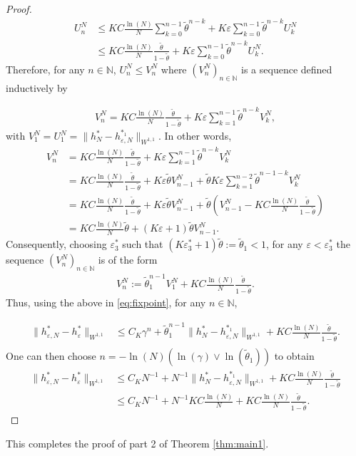 \documentclass[12pt]{article}
\newcommand{\eps}{\varepsilon}
\theoremstyle{plain}
\begin{document}
{\begin{proof}
\begin{align*}
U_n^N &\leq KC\frac{\ln(N)}{N}\sum_{k=0}^{n-1}\tilde \theta^{n-k}+K\eps\sum_{k=0}^{n-1}\tilde \theta^{n-k}U_k^N\\
&\leq KC\frac{\ln(N)}{N}\frac{\tilde \theta}{1-\tilde \theta}+K\eps\sum_{k=0}^{n-1}\tilde \theta^{n-k}U_k^N.
\end{align*}
Therefore, for any $n\in \mathbb N$, $U_n^N\leq V_n^N$ where $(V_n^N)_{n\in \mathbb N}$ is a sequence defined inductively by

\begin{align*}
  V_n^N=KC\frac{\ln(N)}{N}\frac{\tilde \theta}{1-\tilde \theta}+K\eps\sum_{k=1}^{n-1}\tilde \theta^{n-k}V_k^N,
\end{align*}
with $V_1^N=U_1^N=\|h_N^*-h_{\eps,N}^{*_1}\|_{W^{1,1}}$. In other words, 
\begin{align*}
  V_n^N&=KC\frac{\ln(N)}{N}\frac{\tilde \theta}{1-\tilde \theta}+K\eps\sum_{k=1}^{n-1}\tilde \theta^{n-k}V_k^N\\
  &=KC\frac{\ln(N)}{N}\frac{\tilde \theta}{1-\tilde \theta}+K\eps \tilde \theta V_{n-1}^N +\tilde \theta K \eps\sum_{k=1}^{n-2}\tilde \theta^{n-1-k}V_k^N\\
  &=KC\frac{\ln(N)}{N}\frac{\tilde \theta}{1-\tilde \theta}+K\eps \tilde \theta V_{n-1}^N +\tilde \theta \left( V_{n-1}^N-KC\frac{\ln(N)}{N}\frac{\tilde \theta}{1-\tilde \theta}\right)\\
&=KC\frac{\ln(N)}{N}\tilde \theta+(K\eps +1)\tilde \theta  V_{n-1}^N.
\end{align*}
Consequently, choosing $\eps_{3}^*$ such that $(K\eps_{3}^* +1)\tilde \theta:=\tilde\theta_1<1$, for any $\eps <\eps_{3}^*$ the sequence $(V_n^N)_{n\in \mathbb N}$ is of the form
\begin{align*}
V_n^N:=\tilde\theta_1^{n-1}V_1^N+KC\frac{\ln(N)}{N}\frac{\tilde \theta}{1-\tilde \theta}.
\end{align*}
Thus, using the above in \eqref{eq:fixpoint}, for any $n\in \mathbb N$,

\begin{align*}
\|h_{\varepsilon,N}^*-h_\eps^*\|_{W^{1,1}}
&\leq C_K \gamma^n+\tilde\theta_1^{n-1}\|h_N^*-h_{\eps,N}^{*_1}\|_{W^{1,1}}+KC\frac{\ln(N)}{N}\frac{\tilde \theta}{1-\tilde \theta}.\\
\end{align*}
One can then choose $n=-\ln(N)(\ln(\gamma)\vee \ln(\tilde\theta_1))$ to obtain
\begin{align*}
\|h_{\varepsilon,N}^*-h_\eps^*\|_{W^{1,1}}&\leq  C_K N^{-1}+N^{-1}\|h_N^*-h_{\eps,N}^{*_1}\|_{W^{1,1}}+KC\frac{\ln(N)}{N}\frac{\tilde \theta}{1-\tilde \theta}\\
&\leq  C_K N^{-1}+N^{-1}KC\frac{\ln(N)}{N}+KC\frac{\ln(N)}{N}\frac{\tilde \theta}{1-\tilde \theta}.
\end{align*}
\end{proof}
This completes the proof of part 2 of Theorem \ref{thm:main1}.
}
\end{document}
